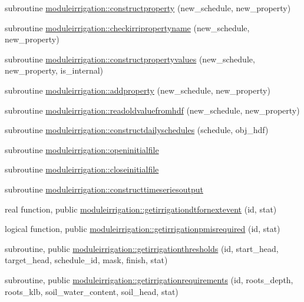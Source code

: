 \begin{DoxyCompactItemize}
subroutine \mbox{\hyperlink{namespacemoduleirrigation_a777c0e9f94d23db57aa011c352cc06d9}{moduleirrigation\+::constructproperty}} (new\+\_\+schedule, new\+\_\+property)
\item 
subroutine \mbox{\hyperlink{namespacemoduleirrigation_a13b8da4174e7efc86d8f045b78cd51fe}{moduleirrigation\+::checkirripropertyname}} (new\+\_\+schedule, new\+\_\+property)
\item 
subroutine \mbox{\hyperlink{namespacemoduleirrigation_afc426b9dbadbb0d592b750d75f2bedfc}{moduleirrigation\+::constructpropertyvalues}} (new\+\_\+schedule, new\+\_\+property, is\+\_\+internal)
\item 
subroutine \mbox{\hyperlink{namespacemoduleirrigation_a992b40277b2c8bae0924d2f8aa1534ec}{moduleirrigation\+::addproperty}} (new\+\_\+schedule, new\+\_\+property)
\item 
subroutine \mbox{\hyperlink{namespacemoduleirrigation_a27adbd031b4482b018dcd962be92a681}{moduleirrigation\+::readoldvaluefromhdf}} (new\+\_\+schedule, new\+\_\+property)
\item 
subroutine \mbox{\hyperlink{namespacemoduleirrigation_af6e24627c25064683d994b7a6fc66c6d}{moduleirrigation\+::constructdailyschedules}} (schedule, obj\+\_\+hdf)
\item 
subroutine \mbox{\hyperlink{namespacemoduleirrigation_a2334c75854146c9d46127bcb0e0c54f2}{moduleirrigation\+::openinitialfile}}
\item 
subroutine \mbox{\hyperlink{namespacemoduleirrigation_a8b1ff94a2633495022dd8e0f95fd56a6}{moduleirrigation\+::closeinitialfile}}
\item 
subroutine \mbox{\hyperlink{namespacemoduleirrigation_af6d787a11912e264ab8d53cc1b691f1c}{moduleirrigation\+::constructtimeseriesoutput}}
\item 
real function, public \mbox{\hyperlink{namespacemoduleirrigation_aa24ee945c35012ad9d3790d40cbd02ab}{moduleirrigation\+::getirrigationdtfornextevent}} (id, stat)
\item 
logical function, public \mbox{\hyperlink{namespacemoduleirrigation_a051749a8f8467229fbb8e6e300b32c9d}{moduleirrigation\+::getirrigationpmisrequired}} (id, stat)
\item 
subroutine, public \mbox{\hyperlink{namespacemoduleirrigation_a64c49f7b68195826fe0693bf10d5cc26}{moduleirrigation\+::getirrigationthresholds}} (id, start\+\_\+head, target\+\_\+head, schedule\+\_\+id, mask, finish, stat)
\item 
subroutine, public \mbox{\hyperlink{namespacemoduleirrigation_a23127929f74fe2c391dc8ddec9c8d44d}{moduleirrigation\+::getirrigationrequirements}} (id, roots\+\_\+depth, roots\+\_\+klb, soil\+\_\+water\+\_\+content, soil\+\_\+head, stat)

\end{DoxyCompactItemize}
